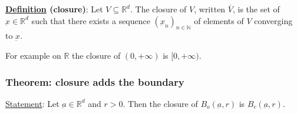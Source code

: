 \documentclass[10pt]{extarticle}
\newcommand{\R}{\mathbb{R}}
\newcommand{\N}{\mathbb{N}}
\newcommand{\munderbar}[1]{\underbar{\ensuremath{#1}}}
\begin{document}
\textbf{\underline{Definition} (closure)}:
Let $V \subseteq \R^d$. The closure of $V$, written $\overline{V}$, is the set of $\munderbar{x} \in \R^d$ such that there exists a sequence $\left(\munderbar{x}_n\right)_{n \in \N}$ of elements of $V$ converging to $\munderbar{x}$.

For example on $\R$ the closure of $(0, +\infty)$ is $[0, +\infty)$.

                \subsubsection{Theorem: closure adds the boundary}

                \underline{Statement}: Let $\munderbar{a} \in \R^d$ and $r > 0$.
                Then the closure of $B_o(\munderbar{a}, r)$ is $B_c(\munderbar{a}, r)$.
\end{document}
